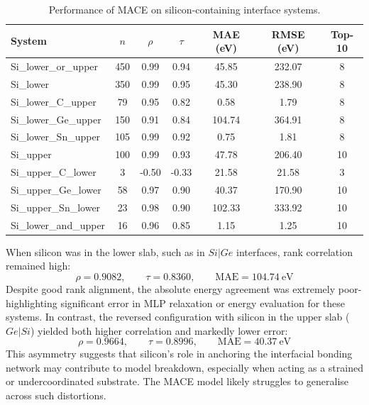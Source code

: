 \begin{table}[H]
\centering
\begin{tabular}{lcccccc}
\toprule
               System &  $n$ &  $\rho$ &  $\tau$ &  MAE (eV) &  RMSE (eV) &  Top-10 \\
\midrule
 Si\_lower\_or\_upper &  450 &    0.99 &    0.94 &     45.85 &     232.07 &       8 \\
            Si\_lower &  350 &    0.99 &    0.95 &     45.30 &     238.90 &       8 \\
  Si\_lower\_C\_upper &   79 &    0.95 &    0.82 &      0.58 &       1.79 &       8 \\
 Si\_lower\_Ge\_upper &  150 &    0.91 &    0.84 &    104.74 &     364.91 &       8 \\
 Si\_lower\_Sn\_upper &  105 &    0.99 &    0.92 &      0.75 &       1.81 &       8 \\
            Si\_upper &  100 &    0.99 &    0.93 &     47.78 &     206.40 &      10 \\
  Si\_upper\_C\_lower &    3 &   -0.50 &   -0.33 &     21.58 &      21.58 &       3 \\
 Si\_upper\_Ge\_lower &   58 &    0.97 &    0.90 &     40.37 &     170.90 &      10 \\
 Si\_upper\_Sn\_lower &   23 &    0.98 &    0.90 &    102.33 &     333.92 &      10 \\
Si\_lower\_and\_upper &   16 &    0.96 &    0.85 &      1.15 &       1.25 &      10 \\
\bottomrule
\end{tabular}
\caption{Performance of MACE on silicon-containing interface systems.}
\label{tab:silicon_systems}
\end{table}

When silicon was in the lower slab, such as in $Si|Ge$ interfaces, rank correlation remained high:
\begin{equation}
    \rho = 0.9082, \qquad \tau = 0.8360, \qquad \text{MAE} = 104.74~\text{eV}
\end{equation}
Despite good rank alignment, the absolute energy agreement was extremely poor-highlighting significant error in MLP relaxation or energy evaluation for these systems.
In contrast, the reversed configuration with silicon in the upper slab ($Ge|Si$) yielded both higher correlation and markedly lower error:
\begin{equation}
    \rho = 0.9664, \qquad \tau = 0.8996, \qquad \text{MAE} = 40.37~\text{eV}
\end{equation}
This asymmetry suggests that silicon's role in anchoring the interfacial bonding network may contribute to model breakdown, especially when acting as a strained or undercoordinated substrate.
The MACE model likely struggles to generalise across such distortions.

